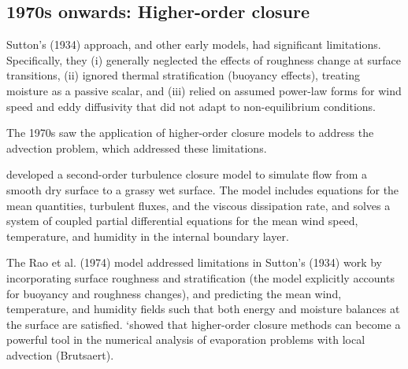 \documentclass{article}
\begin{document}
    
     
    \subsection*{1970s onwards: Higher-order closure}
    
    
     Sutton’s (1934) approach, and other early models, had significant  limitations. Specifically, they (i) generally neglected the effects of roughness change at surface transitions, (ii) ignored thermal stratification (buoyancy effects), treating moisture as a passive scalar, and (iii) relied on assumed power-law forms for wind speed and eddy diffusivity that did not adapt to non-equilibrium conditions.
     
     The 1970s saw the application of higher-order closure models to address the advection problem, which addressed these limitations. 
     
    
      \citet{rao1974local} developed a second-order turbulence closure model to simulate flow from a smooth dry surface to a grassy wet surface. The model includes equations for the mean quantities, turbulent fluxes, and the viscous dissipation rate, and solves a system of coupled partial differential equations for the mean wind speed, temperature, and humidity in the internal boundary layer.
      
    The Rao et al. (1974) model addressed limitations in Sutton's (1934) work by incorporating surface roughness and stratification (the model explicitly accounts for buoyancy  and roughness changes), and predicting the mean wind, temperature, and humidity fields such that both energy and moisture balances at the surface are satisfied.
    \citet{rao1974local} `showed that higher-order closure methods can become a powerful tool in the numerical analysis of evaporation problems with local advection (Brutsaert). 
    
\end{document}
